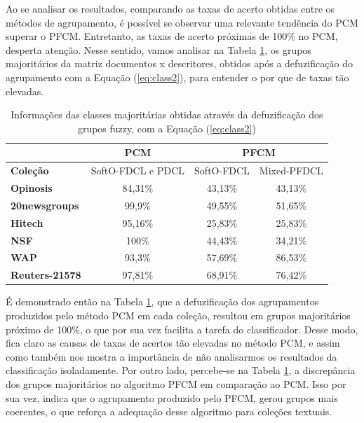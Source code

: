 Ao se analisar os resultados, comparando as taxas de acerto obtidas entre os métodos de agrupamento,
é possível se observar uma relevante tendência do PCM superar o PFCM. Entretanto, as taxas de acerto
próximas de 100\% no PCM, desperta atenção. Nesse sentido, vamos analisar na Tabela
\ref{table:pdclmajority}, os grupos majoritários da matriz documentos x descritores, obtidos após a
defuzificação do agrupamento com a Equação (\ref{eq:class2}), para entender o por que de taxas tão
elevadas. 

\begin{table}[!htp]
  \centering
  \begin{tabular}{|l|c|c c|}
    \hline
    & PCM & \multicolumn{2}{c|}{PFCM} \\
    \hline
    {\bf Coleção} & SoftO-FDCL e PDCL & SoftO-FDCL & Mixed-PFDCL \\
    \hline
    {\bf Opinosis} & 84,31\% & 43,13\% & 43,13\% \\
    \hline
    {\bf 20newsgroups} & 99,9\% & 49,55\% & 51,65\% \\
    \hline
    {\bf Hitech} & 95,16\% & 25,83\% & 25,83\% \\
    \hline
    {\bf NSF} & 100\% & 44,43\% &  34,21\% \\
    \hline
    {\bf WAP} & 93,3\% & 57,69\% & 86,53\% \\
    \hline
    {\bf Reuters-21578} & 97,81\% & 68,91\% & 76,42\% \\
    \hline
  \end{tabular}
  \caption{Informações das classes majoritárias obtidas através da defuzificação dos grupos fuzzy,
  com a Equação (\ref{eq:class2})}
  \label{table:pdclmajority}
\end{table}

É demonstrado então na Tabela \ref{table:pdclmajority}, que a defuzificação dos agrupamentos
produzidos pelo método PCM em cada coleção, resultou em grupos majoritários próximo de 100\%, o que
por sua vez facilita a tarefa do classificador. Desse modo, fica claro as causas de taxas de acertos
tão elevadas no método PCM, e assim como também nos mostra a importância de não analisarmos os
resultados da classificação isoladamente. Por outro lado, percebe-se na Tabela
\ref{table:pdclmajority}, a discrepância dos grupos majoritários no algoritmo PFCM em comparação ao
PCM. Isso por sua vez, indica que o agrupamento produzido pelo PFCM, gerou grupos mais coerentes, o
que reforça a adequação desse algoritmo para coleções textuais.

